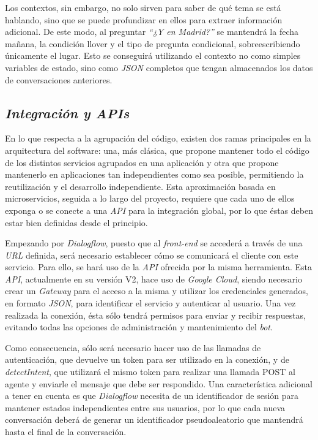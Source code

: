 \documentclass[11pt,spanish,listoffigures]{tfgetsinf}
\begin{document}
Los contextos, sin embargo, no solo sirven para saber de qué tema se está hablando, sino que se puede profundizar en ellos para extraer información adicional. De este modo, al preguntar \textit{“¿Y en Madrid?”} se mantendrá la fecha mañana, la condición llover y el tipo de pregunta condicional, sobreescribiendo únicamente el lugar. Esto se conseguirá utilizando el contexto no como simples variables de estado, sino como \textit{JSON} completos que tengan almacenados los datos de conversaciones anteriores.


\subsection{\textit{Integración y APIs}}
\label{subsec:design-integracion-y-apis}

En lo que respecta a la agrupación del código, existen dos ramas principales en la arquitectura del software: una, más clásica, que propone mantener todo el código de los distintos servicios agrupados en una aplicación y otra que propone mantenerlo en aplicaciones tan independientes como sea posible, permitiendo la reutilización y el desarrollo independiente. Esta aproximación basada en microservicios, seguida a lo largo del proyecto, requiere que cada uno de ellos exponga o se conecte a una \textit{API} para la integración global, por lo que éstas deben estar bien definidas desde el principio.

Empezando por \textit{Dialogflow}, puesto que al \textit{front-end} se accederá a través de una \textit{URL} definida, será necesario establecer cómo se comunicará el cliente con este servicio. Para ello, se hará uso de la \textit{API} ofrecida por la misma herramienta. Esta \textit{API}, actualmente en su versión V2, hace uso de \textit{Google Cloud}, siendo necesario crear un \textit{Gateway} para el acceso a la misma y utilizar los credenciales generados, en formato \textit{JSON}, para identificar el servicio y autenticar al usuario. Una vez realizada la conexión, ésta sólo tendrá permisos para enviar y recibir respuestas, evitando  todas las opciones de administración y mantenimiento del \textit{bot}.

Como consecuencia, sólo será necesario hacer uso de las llamadas de autenticación, que devuelve un token para ser utilizado en la conexión, y de \textit{detectIntent}, que utilizará el mismo token para realizar una llamada POST al agente y enviarle el mensaje que debe ser respondido. Una característica adicional a tener en cuenta es que \textit{Dialogflow} necesita de un identificador de sesión para mantener estados independientes entre sus usuarios, por lo que cada nueva conversación deberá de generar un identificador pseudoaleatorio que mantendrá hasta el final de la conversación. 
\end{document}
